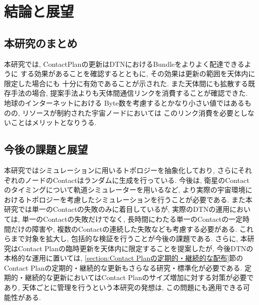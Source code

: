 \chapter{結論と展望}
\label{chap:conclusion}
\section{本研究のまとめ}
本研究では, ContactPlanの更新はDTNにおけるBundleをよりよく配達できるように
する効果があることを確認するとともに, その効果は更新の範囲を天体内に限定した場合にも
十分に有効であることが示された. また天体間にも拡散する既存手法の場合, 
提案手法よりも天体間通信リンクを消費することが確認できた. 地球のインターネットにおける
Byte数を考慮するとかなり小さい値ではあるものの, リソースが制約された宇宙ノードにおいては
このリンク消費を必要としないことはメリットとなりうる. 

\section{今後の課題と展望}
本研究ではシミュレーションに用いるトポロジーを抽象化しており, 
さらにそれぞれのノードのContactはランダムに生成を行っている. 
今後は, 衛星のContactのタイミングについて軌道シミュレーターを用いるなど, 
より実際の宇宙環境におけるトポロジーを考慮したシミュレーションを行うことが必要である. 
また本研究では単一のContactの失敗のみに着目しているが, 
実際のDTNの運用においては, 単一のContactの失敗だけでなく, 
長時間にわたる単一のContactの一定時間だけの障害や, 
複数のContactの連続した失敗なども考慮する必要がある. 
これらまで対象を拡大し, 包括的な検証を行うことが今後の課題である. 
さらに, 本研究はContact Planの臨時更新を天体内に限定することを提案したが, 
今後DTNの本格的な運用に置いては, \ref{section:Contact Planの定期的・継続的な配布}節の
Contact Planの定期的・継続的な更新もさらなる研究・標準化が必要である. 
定期的・継続的な更新においてはContact Planのサイズ増加に対する対策が必要であり, 
天体ごとに管理を行うという本研究の発想は, この問題にも適用できる可能性がある. 
